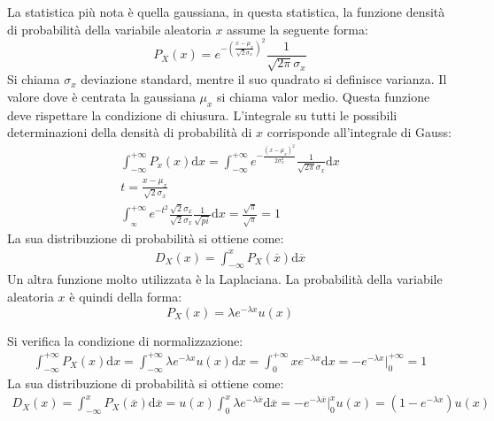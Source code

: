 \documentclass{article}
\newcommand{\df}{\mathrm{d}}
\numberwithin{equation}{subsection}
\begin{document}
La statistica più nota è quella gaussiana, in questa statistica, la funzione densità di probabilità della variabile aleatoria $x$ assume la seguente forma:
\begin{equation}
    P_X(x)=\displaystyle e^{-\left(\frac{x-\mu_x}{\sqrt{2}\sigma_x}\right)^2}\frac{1}{\sqrt{2\pi}\sigma_x}
\end{equation}
Si chiama $\sigma_x$ deviazione standard, mentre il suo quadrato si definisce varianza. Il valore dove è centrata la gaussiana $\mu_x$ si chiama valor medio. 
Questa funzione deve rispettare la condizione di chiusura. 
L'integrale su tutti le possibili determinazioni della densità di probabilità di $x$ corrisponde all'integrale di Gauss:
\begin{gather*}
    \displaystyle\int_{-\infty}^{+\infty}P_x(x)\df x=\int_{-\infty}^{+\infty}e^{-\frac{(x-\mu_x)^2}{2\sigma_x^2}}\frac{1}{\sqrt{2\pi}\sigma_x}\df x\\
    t=\displaystyle\frac{x-\mu_x}{\sqrt{2}\sigma_x}\\
    \displaystyle\int_{_\infty}^{+\infty}e^{-t^2}\frac{\sqrt{2}{\sigma_x}}{\sqrt{2}\sigma_x}\frac{1}{\sqrt{pi}}{\df x}=\frac{\sqrt{\pi}}{\sqrt{\pi}}=1
\end{gather*}
La sua distribuzione di probabilità si ottiene come:
\begin{gather*}
    D_X(x)=\displaystyle\int_{-\infty}^xP_X(\overline{x})\df\overline{x}
\end{gather*}
Un altra funzione molto utilizzata è la Laplaciana. La probabilità della variabile aleatoria $x$ è quindi della forma:
\begin{equation}
    P_X(x)=\lambda e^{-\lambda x}u(x)
\end{equation}

Si verifica la condizione di normalizzazione:
\begin{gather*}
    \displaystyle\int_{-\infty}^{+\infty}P_X(x)\df x=\int_{-\infty}^{+\infty}\lambda e^{-\lambda x}u(x)\df x=\int_0^{+\infty}xe^{-\lambda x}\df x=-e^{-\lambda x}\Bigg|_0^{+\infty}=1
\end{gather*}
La sua distribuzione di probabilità si ottiene come:
\begin{gather*}
    D_X(x)=\displaystyle\int_{-\infty}^xP_X(\overline{x})\df\overline{x}=u(x)\int_0^x\lambda e^{-\lambda\overline{x}}\df\overline{x}=-e^{-\lambda\overline{x}}\Bigg|_0^xu(x)=\left(1-e^{-\lambda x}\right)u(x)
\end{gather*}
\end{document}
